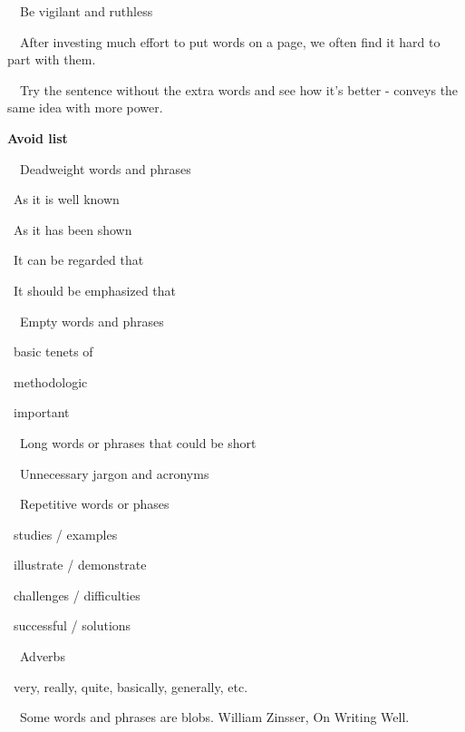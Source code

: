 \documentclass[a4paper, 12pt]{article}
\begin{document}
\par\ \textbullet\ Be vigilant and ruthless

\par\ \textbullet\ After investing much effort to put words on a page, we often find it hard to part with them.

\par\ \textbullet\ Try the sentence without the extra words and see how it's better - conveys the same idea with more power.

\par\textbf{Avoid list}
\par\ \textbullet\ Deadweight words and phrases
\par\quad\textopenbullet\ As it is well known
\par\quad\textopenbullet\ As it has been shown
\par\quad\textopenbullet\ It can be regarded that
\par\quad\textopenbullet\ It should be emphasized that
\par\ \textbullet\ Empty words and phrases
\par\quad\textopenbullet\ basic tenets of
\par\quad\textopenbullet\ methodologic
\par\quad\textopenbullet\ important
\par\ \textbullet\ Long words or phrases that could be short
\par\ \textbullet\ Unnecessary jargon and acronyms
\par\ \textbullet\ Repetitive words or phases
\par\quad\textopenbullet\ studies / examples
\par\quad\textopenbullet\ illustrate / demonstrate
\par\quad\textopenbullet\ challenges / difficulties
\par\quad\textopenbullet\ successful / solutions
\par\ \textbullet\ Adverbs
\par\quad\textopenbullet\ very, really, quite, basically, generally, etc.

\par\ \textbullet\ Some words and phrases are blobs. William Zinsser, On Writing Well.
\end{document}
